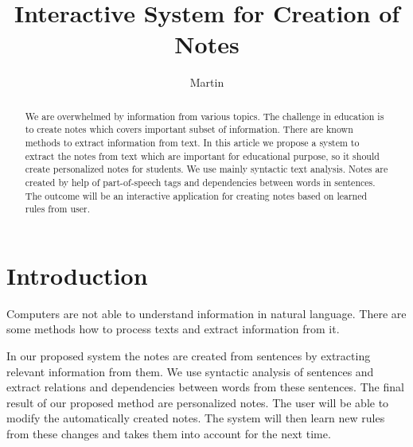 \documentclass{iitsrc}
\title{Interactive System for Creation of Notes}
\author{Martin}{Nemček}
\begin{document}
\begin{abstract}
	We are overwhelmed by information from various topics. The challenge in education is to create notes which covers important subset of information. There are known methods to extract information from text. In this article we propose a system to extract the notes from text which are important for educational purpose, so it should create personalized notes for students. We use mainly syntactic text analysis. Notes are created by help of part-of-speech tags and dependencies between words in sentences. The outcome will be an interactive application for creating notes based on learned rules from user.
\end{abstract}

\section{Introduction} \label{introduction}
%	
%	
	Computers are not able to understand information in natural language. There are some methods how to process texts and extract information from it.
	
	In our proposed system the notes are created from sentences by extracting relevant information from them. We use syntactic analysis of sentences and extract relations and dependencies between words from these sentences. The final result of our proposed method are personalized notes. The user will be able to modify the automatically created notes. The system will then learn new rules from these changes and takes them into account for the next time.
	
\end{document}
